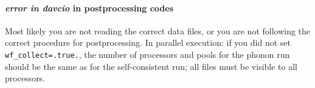 \documentclass[12pt,a4paper]{article}
\begin{document}
\paragraph{{\em error in davcio} in postprocessing codes}
Most likely you are not reading the correct data files, or you are not
following the correct procedure for postprocessing. In parallel execution: 
if you did not set \texttt{wf\_collect=.true.}, the number of processors and 
pools for the phonon run should be the same as for the
self-consistent run; all files must be visible to all processors.
\end{document}
